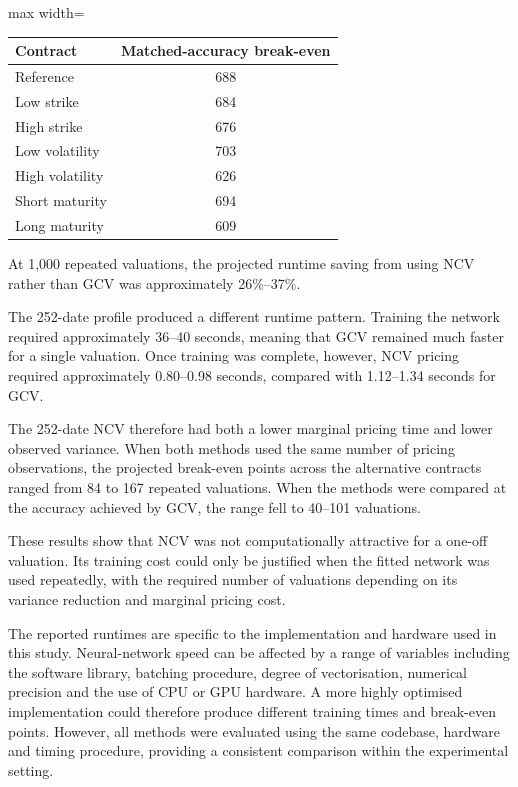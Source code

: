 \begin{table}[h]
\centering
\begin{adjustbox}{max width=\textwidth}
\begin{tabular}{lc}
\hline
Contract & Matched-accuracy break-even \\
\hline
Reference & 688 \\
Low strike & 684 \\
High strike & 676 \\
Low volatility & 703 \\
High volatility & 626 \\
Short maturity & 694 \\
Long maturity & 609 \\
\hline
\end{tabular}
\end{adjustbox}
\end{table}

At 1,000 repeated valuations, the projected runtime saving from using NCV rather than GCV was approximately 26\%--37\%.

The 252-date profile produced a different runtime pattern. Training the network required approximately 36--40 seconds, meaning that GCV remained much faster for a single valuation. Once training was complete, however, NCV pricing required approximately 0.80--0.98 seconds, compared with 1.12--1.34 seconds for GCV.

The 252-date NCV therefore had both a lower marginal pricing time and lower observed variance. When both methods used the same number of pricing observations, the projected break-even points across the alternative contracts ranged from 84 to 167 repeated valuations. When the methods were compared at the accuracy achieved by GCV, the range fell to 40--101 valuations.

These results show that NCV was not computationally attractive for a one-off valuation. Its training cost could only be justified when the fitted network was used repeatedly, with the required number of valuations depending on its variance reduction and marginal pricing cost.

The reported runtimes are specific to the implementation and hardware used in this study. Neural-network speed can be affected by a range of variables including the software library, batching procedure, degree of vectorisation, numerical precision and the use of CPU or GPU hardware. A more highly optimised implementation could therefore produce different training times and break-even points. However, all methods were evaluated using the same codebase, hardware and timing procedure, providing a consistent comparison within the experimental setting.

